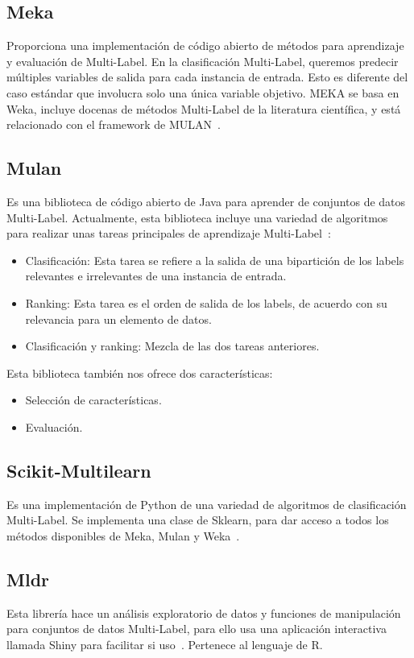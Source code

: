 \subsection{Meka}
Proporciona una implementación de código abierto de métodos para aprendizaje y evaluación de Multi-Label. En la clasificación Multi-Label, queremos predecir múltiples variables de salida para cada instancia de entrada. Esto es diferente del caso estándar que involucra solo una única variable objetivo. MEKA se basa en Weka, incluye docenas de métodos Multi-Label de la literatura científica, y está relacionado con el framework de MULAN~\cite{meka}.

\subsection{Mulan}
Es una biblioteca de código abierto de Java para aprender de conjuntos de datos Multi-Label. Actualmente, esta biblioteca incluye una variedad de algoritmos para realizar unas tareas principales de aprendizaje Multi-Label~\cite{mulan}:
\begin{itemize}
	\item Clasificación: Esta tarea se refiere a la salida de una bipartición de los labels relevantes e irrelevantes de una instancia de entrada.
	\item Ranking: Esta tarea es el orden de salida de los labels, de acuerdo con su relevancia para un elemento de datos.
	\item Clasificación y ranking: Mezcla de las dos tareas anteriores.
\end{itemize}
Esta biblioteca también nos ofrece dos características:
\begin{itemize}
	\item Selección de características.
	\item Evaluación.
\end{itemize}

\subsection{Scikit-Multilearn}
Es una implementación de Python de una variedad de algoritmos de clasificación Multi-Label.
Se implementa una clase de Sklearn, para dar acceso a todos los métodos disponibles de Meka, Mulan y Weka~\cite{scikit-multilearn}.

\subsection{Mldr}
Esta librería hace un análisis exploratorio de datos y funciones de manipulación para conjuntos de datos Multi-Label, para ello usa una aplicación interactiva llamada Shiny para facilitar si uso~\cite{mldr}.
Pertenece al lenguaje de R.

